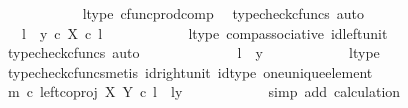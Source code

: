 \begin{isabellebody}
\ \ \ \ \ \ \ \ \ \ \isamarkupfalse%
\ l{\isacharunderscore}{\kern0pt}type\ cfunc{\isacharunderscore}{\kern0pt}prod{\isacharunderscore}{\kern0pt}comp\ \isamarkupfalse%
\ {\isacharparenleft}{\kern0pt}typecheck{\isacharunderscore}{\kern0pt}cfuncs{\isacharcomma}{\kern0pt}\ auto{\isacharparenright}{\kern0pt}\isanewline
\ \ \ \ \ \ \ \ \isamarkupfalse%
\ \isamarkupfalse%
\ {\isachardoublequoteopen}{\isachardot}{\kern0pt}{\isachardot}{\kern0pt}{\isachardot}{\kern0pt}\ {\isacharequal}{\kern0pt}\ {\isasymlangle}l\ {\isacharcomma}{\kern0pt}\ y{}\ {\isasymcirc}\isactrlsub c\ {\isasymbeta}\isactrlbsub X\isactrlesub \ {\isasymcirc}\isactrlsub c\ l{\isasymrangle}{\isachardoublequoteclose}\isanewline
\ \ \ \ \ \ \ \ \ \ \isamarkupfalse%
\ l{\isacharunderscore}{\kern0pt}type\ comp{\isacharunderscore}{\kern0pt}associative{}\ id{\isacharunderscore}{\kern0pt}left{\isacharunderscore}{\kern0pt}unit{}\ \isamarkupfalse%
\ {\isacharparenleft}{\kern0pt}typecheck{\isacharunderscore}{\kern0pt}cfuncs{\isacharcomma}{\kern0pt}\ auto{\isacharparenright}{\kern0pt}\isanewline
\ \ \ \ \ \ \ \ \isamarkupfalse%
\ \isamarkupfalse%
\ {\isachardoublequoteopen}{\isachardot}{\kern0pt}{\isachardot}{\kern0pt}{\isachardot}{\kern0pt}\ {\isacharequal}{\kern0pt}\ {\isasymlangle}l\ {\isacharcomma}{\kern0pt}\ y{}{\isasymrangle}{\isachardoublequoteclose}\isanewline
\ \ \ \ \ \ \ \ \ \ \isamarkupfalse%
\ l{\isacharunderscore}{\kern0pt}type\ \isamarkupfalse%
\ {\isacharparenleft}{\kern0pt}typecheck{\isacharunderscore}{\kern0pt}cfuncs{\isacharcomma}{\kern0pt}metis\ id{\isacharunderscore}{\kern0pt}right{\isacharunderscore}{\kern0pt}unit{}\ id{\isacharunderscore}{\kern0pt}type\ one{\isacharunderscore}{\kern0pt}unique{\isacharunderscore}{\kern0pt}element{\isacharparenright}{\kern0pt}\isanewline
\ \ \ \ \ \ \ \ \isamarkupfalse%
\ \isamarkupfalse%
\ {\isachardoublequoteopen}m\ {\isasymcirc}\isactrlsub c\ left{\isacharunderscore}{\kern0pt}coproj\ X\ Y\ {\isasymcirc}\isactrlsub c\ l\ {\isacharequal}{\kern0pt}\ {\isasymlangle}l{\isacharcomma}{\kern0pt}y{}{\isasymrangle}{\isachardoublequoteclose}\isanewline
\ \ \ \ \ \ \ \ \ \ \isamarkupfalse%
\ {\isacharparenleft}{\kern0pt}simp\ add{\isacharcolon}{\kern0pt}\ calculation{\isacharparenright}{\kern0pt}\isanewline
\ \ \ \ \ \ \isamarkupfalse%
\isanewline
\isanewline
\ \ \ \ \ \ \isamarkupfalse%

\end{isabellebody}
